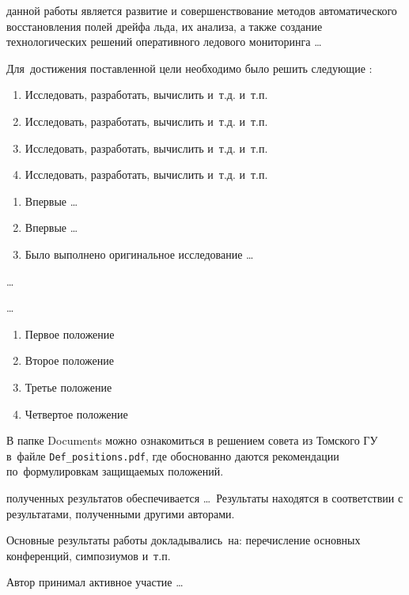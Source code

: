 {\aim} данной работы является развитие и совершенствование методов автоматического восстановления полей дрейфа льда, их анализа, а также создание технологических решений оперативного ледового мониторинга \ldots

Для~достижения поставленной цели необходимо было решить следующие {\tasks}:
\begin{enumerate}
  \item Исследовать, разработать, вычислить и~т.\:д. и~т.\:п.
  \item Исследовать, разработать, вычислить и~т.\:д. и~т.\:п.
  \item Исследовать, разработать, вычислить и~т.\:д. и~т.\:п.
  \item Исследовать, разработать, вычислить и~т.\:д. и~т.\:п.
\end{enumerate}


{\novelty}
\begin{enumerate}
  \item Впервые \ldots
  \item Впервые \ldots
  \item Было выполнено оригинальное исследование \ldots
\end{enumerate}

{\influence} \ldots

{\methods} \ldots

{}
\begin{enumerate}
  \item Первое положение
  \item Второе положение
  \item Третье положение
  \item Четвертое положение
\end{enumerate}
В папке Documents можно ознакомиться в решением совета из Томского ГУ
в~файле \verb+Def_positions.pdf+, где обоснованно даются рекомендации
по~формулировкам защищаемых положений. 

{\reliability} полученных результатов обеспечивается \ldots \ Результаты находятся в соответствии с результатами, полученными другими авторами.


{\probation}
Основные результаты работы докладывались~на:
перечисление основных конференций, симпозиумов и~т.\:п.

{\contribution} Автор принимал активное участие \ldots


